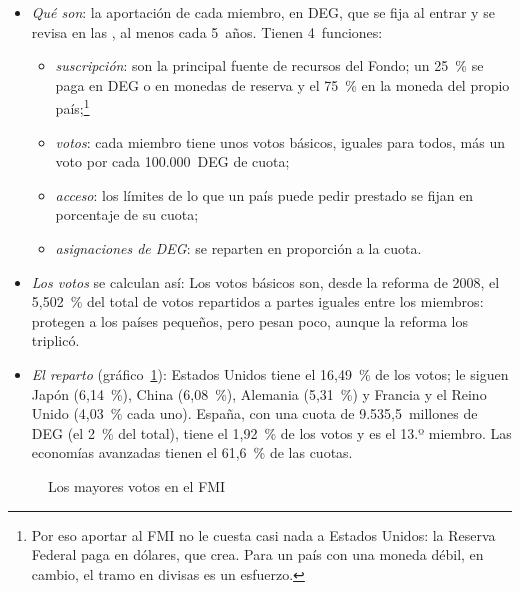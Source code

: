 \documentclass[11pt]{article}
\begin{document}
\begin{itemize}
\item \emph{Qué son}: la aportación de cada miembro, en DEG, que se fija al entrar y se revisa en las , al menos cada 5~años. Tienen 4~funciones:
  \begin{itemize}
  \item \emph{suscripción}: son la principal fuente de recursos del Fondo; un 25~\% se paga en DEG o en monedas de reserva y el 75~\% en la moneda del propio país;\footnote{Por eso aportar al FMI no le cuesta casi nada a Estados Unidos: la Reserva Federal paga en dólares, que crea. Para un país con una moneda débil, en cambio, el tramo en divisas es un esfuerzo.}
  \item \emph{votos}: cada miembro tiene unos votos básicos, iguales para todos, más un voto por cada 100.000~DEG de cuota;
  \item \emph{acceso}: los límites de lo que un país puede pedir prestado se fijan en porcentaje de su cuota;
  \item \emph{asignaciones de DEG}: se reparten en proporción a la cuota.
  \end{itemize}
\item \emph{Los votos} se calculan así:
  Los votos básicos son, desde la reforma de 2008, el 5,502~\% del total de votos repartidos a partes iguales entre los miembros: protegen a los países pequeños, pero pesan poco, aunque la reforma los triplicó.
\item \emph{El reparto} (gráfico~\ref{fig:cuotas-votos}): Estados Unidos tiene el 16,49~\% de los votos; le siguen Japón (6,14~\%), China (6,08~\%), Alemania (5,31~\%) y Francia y el Reino Unido (4,03~\% cada uno). España, con una cuota de 9.535,5~millones de DEG (el 2~\% del total), tiene el 1,92~\% de los votos y es el 13.º miembro. Las economías avanzadas tienen el 61,6~\% de las cuotas\nocite{FMI2026Cuotas,FMI2026FA}.
\end{itemize}

\begin{figure}[H]
\centering
\caption{Los mayores votos en el FMI}\label{fig:cuotas-votos}
\end{figure}
\end{document}
